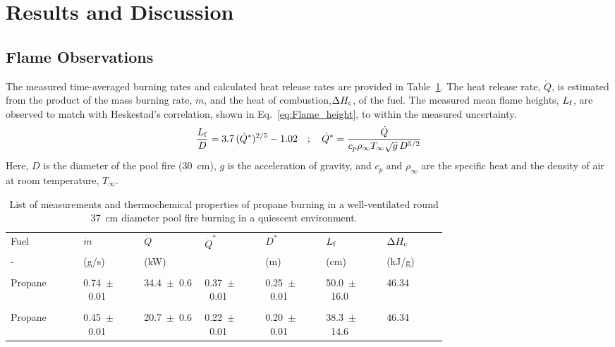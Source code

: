 \documentclass[12pt]{ussci}
\begin{document}
\section{Results and Discussion}
\subsection{Flame Observations}
The measured time-averaged burning rates and calculated heat release rates are provided in Table~\ref{tab:Pool_Fire_Parameters_Table}. The heat release rate, $\dot{Q}$, is estimated from the product of the mass burning rate, $\dot{m}$, and the heat of combustion,$\Delta H_{\rm c}$, of the fuel. The measured mean flame heights, $L_{\rm f}$, are observed to match with Heskestad's correlation, shown in Eq.~\ref{eq:Flame_height}, to within the measured uncertainty.
\begin{equation}\label{eq:Flame_height}
\frac{L_{\rm f}}{D} = 3.7 \, (\dot{Q}^*)^{2/5} - 1.02 \quad ; \quad \dot{Q}^*=\frac{\dot{Q}}{c_{p}\rho_\infty T_\infty \sqrt{g} \, D^{5/2}}
\end{equation}
Here, $D$ is the diameter of the pool fire (30~cm), $g$ is the acceleration of gravity, and $c_p$ and $\rho_\infty$ are the specific heat and the density of air at room temperature, $T_\infty$. 

\begin{table}[!t]
\caption[List of measurements and thermochemical properties of fuels]{List of measurements and thermochemical properties of propane burning in a well-ventilated round 37~cm diameter pool fire burning in a quiescent environment.}
\label{tab:Pool_Fire_Parameters_Table}
\centering
	\footnotesize
	\begin{tabular}{p{0.125\linewidth}p{0.1\linewidth}p{0.1\linewidth}p{0.1\linewidth}p{0.1\linewidth}p{0.1\linewidth}p{0.1\linewidth}}
\hline
{Fuel} &{$\dot{m}$}& { $\dot{Q}$}& {$\dot{Q}^* $}&{$D^*$}&{$L_{\rm f}$}&{$\Delta H_{\rm c}$~\cite{SFPE}}\\
{-} &{(\si{g/{s}})}& {(\si{kW})}& {}&{(\si{m})}&{(\si{cm})}&{(kJ/g)}\\
\hline
\\[0.01cm]
Propane		&	0.74~$\pm$~0.01 & 34.4~$\pm$~0.6 & 0.37~$\pm$~0.01 & 0.25~$\pm$~0.01 & 50.0~$\pm$~16.0 & 46.34\\
\\[0.01cm]
Propane		&	0.45~$\pm$~0.01 & 20.7~$\pm$~0.6 &0.22~$\pm$~0.01 & 0.20~$\pm$~0.01 &	38.3~$\pm$~14.6 & 46.34\\
\hline
\end{tabular}
\end{table}
\end{document}

